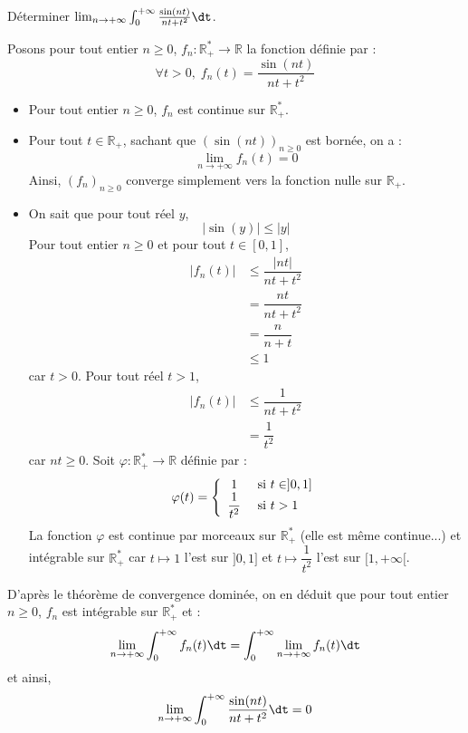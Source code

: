 \documentclass[a4paper,10pt]{report}
\begin{document}
\medskip

\begin{Exercice}{} Déterminer $\lim_{n \to + \infty} \int_{0}^{ + \infty} \frac{\sin(nt)}{nt + t^{2}} \dt$.
\end{Exercice}

\corr Posons pour tout entier $n \geq 0$, $f_n : \mathbb{R}_+^* \rightarrow \mathbb{R}$ la fonction définie par :
$$ \forall t >0, \; f_n(t) = \frac{\sin(nt)}{nt + t^{2}}$$
\begin{itemize}
\item Pour tout entier $n \geq 0$, $f_n$ est continue sur $\mathbb{R}_+^*$.
\item Pour tout $t \in \mathbb{R}_+$, sachant que $(\sin(nt))_{n \geq 0}$ est bornée, on a :
$$ \lim_{n \rightarrow + \infty} f_n(t) = 0$$
Ainsi, $(f_n)_{n \geq 0}$ converge simplement vers la fonction nulle sur $\mathbb{R}_+$.
\item On sait que pour tout réel $y$,
$$ \vert \sin(y) \vert \leq \vert y \vert$$
Pour tout entier $n \geq 0$ et pour tout $t \in [0,1]$,
\begin{align*}
\vert f_n(t) \vert & \leq \dfrac{\vert nt \vert }{nt+t^2} \\
& = \dfrac{nt}{nt+t^2} \\
& = \dfrac{n}{n+t} \\
& \leq 1
\end{align*}
car $t >0$. Pour tout réel $t>1$,
\begin{align*}
\vert f_n(t) \vert & \leq \dfrac{1}{nt+t^2} \\
& = \dfrac{1}{t^2} 
\end{align*}
car $nt \geq 0$. Soit $\varphi : \mathbb{R}_+^* \rightarrow \mathbb{R}$ définie par :
$$ \varphi(t) = \left\lbrace \begin{array}{cl}
1 & \hbox{ si } t \in ]0,1] \\
\dfrac{1}{t^2} & \hbox{ si } t>1 \\
\end{array}\right.$$
La fonction $\varphi$ est continue par morceaux sur $\mathbb{R}_+^*$ (elle est même continue...) et intégrable sur $\mathbb{R}_+^*$ car $t \mapsto 1$ l'est sur $]0,1]$ et $t \mapsto \dfrac{1}{t^2}$ l'est sur $[1, + \infty[$. 
\end{itemize}
D'après le théorème de convergence dominée, on en déduit que pour tout entier $n \geq 0$, $f_n$ est intégrable sur $\mathbb{R}_+^*$ et :
$$ \lim_{n \rightarrow + \infty} \int_0^{+ \infty} f_n(t) \dt = \int_0^{+ \infty} \lim_{n \rightarrow + \infty}f_n(t) \dt$$
et ainsi,
$$ \lim_{n \to + \infty} \int_{0}^{ + \infty} \frac{\sin(nt)}{nt + t^{2}} \dt = 0$$
\end{document}
